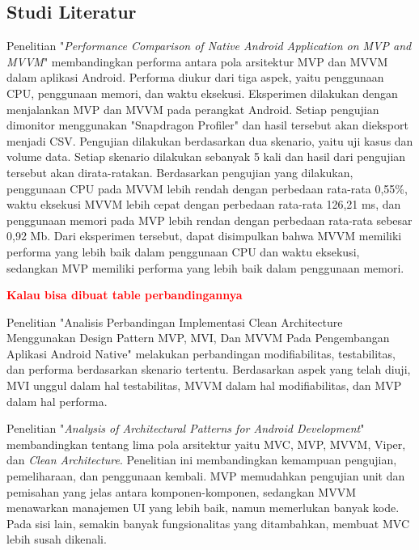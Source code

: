 \documentclass[conference]{IEEEtran}
\begin{document}
	\subsection{Studi Literatur}
	Penelitian "\textit{Performance Comparison of Native Android Application on MVP and MVVM}" \cite{Wis2020} membandingkan performa antara pola arsitektur MVP dan MVVM dalam aplikasi Android. Performa diukur dari tiga aspek, yaitu penggunaan CPU, penggunaan memori, dan waktu eksekusi. Eksperimen dilakukan dengan menjalankan MVP dan MVVM pada perangkat Android. Setiap pengujian dimonitor menggunakan "Snapdragon Profiler" dan hasil tersebut akan dieksport menjadi CSV. Pengujian dilakukan berdasarkan dua skenario, yaitu uji kasus dan volume data. Setiap skenario dilakukan sebanyak 5 kali dan hasil dari pengujian tersebut akan dirata-ratakan. Berdasarkan pengujian yang dilakukan, penggunaan CPU pada MVVM lebih rendah dengan perbedaan rata-rata 0,55\%, waktu eksekusi MVVM lebih cepat dengan perbedaan rata-rata 126,21 ms, dan penggunaan memori pada MVP lebih rendan dengan perbedaan rata-rata sebesar 0,92 Mb. Dari eksperimen tersebut, dapat disimpulkan bahwa MVVM memiliki performa yang lebih baik dalam penggunaan CPU dan waktu eksekusi, sedangkan MVP memiliki performa yang lebih baik dalam penggunaan memori.
	
	\textbf{\textcolor{red}{Kalau bisa dibuat table perbandingannya}}
 
	Penelitian "Analisis Perbandingan Implementasi Clean Architecture Menggunakan Design Pattern MVP, MVI, Dan MVVM Pada Pengembangan Aplikasi Android Native" \cite{Fir2024} melakukan perbandingan modifiabilitas, testabilitas, dan performa berdasarkan skenario tertentu. Berdasarkan aspek yang telah diuji, MVI unggul dalam hal testabilitas, MVVM dalam hal modifiabilitas, dan MVP dalam hal performa.
 
	Penelitian "\textit{Analysis of Architectural Patterns for Android Development}" \cite{Akh2021} membandingkan tentang lima pola arsitektur yaitu MVC, MVP, MVVM, Viper, dan \textit{Clean Architecture}. Penelitian ini membandingkan kemampuan pengujian, pemeliharaan, dan penggunaan kembali. MVP memudahkan pengujian unit dan pemisahan yang jelas antara komponen-komponen, sedangkan MVVM menawarkan manajemen UI yang lebih baik, namun memerlukan banyak kode. Pada sisi lain, semakin banyak fungsionalitas yang ditambahkan, membuat MVC lebih susah dikenali.
 
\end{document}
